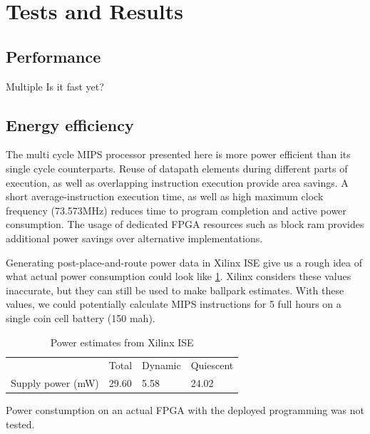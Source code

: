 \section{Tests and Results}


\subsection{Performance}

Multiple 
Is it fast yet?

\subsection{Energy efficiency}

The multi cycle MIPS processor presented here is more power efficient than its single cycle counterparts.
Reuse of datapath elements during different parts of execution, as well as overlapping instruction execution provide area savings.
A short average-instruction execution time, as well as high maximum clock frequency (73.573MHz) reduces time to program completion and active power consumption.
The usage of dedicated FPGA resources such as block ram provides additional power savings over alternative implementations.

Generating post-place-and-route power data in Xilinx ISE give us a rough idea of what actual power consumption could look like \ref{tab:power-estimates}.
Xilinx considers these values inaccurate, but they can still be used to make ballpark estimates.
With these values, we could potentially calculate MIPS instructions for 5 full hours on a single coin cell battery (150 mah).

\begin{table}[h]
  \centering
  \begin{tabular}{llll}
    & Total & Dynamic & Quiescent \\
    Supply power (mW) & 29.60 & 5.58    & 24.02
  \end{tabular}
  \caption{Power estimates from Xilinx ISE}
  \label{tab:power-estimates}
\end{table}

Power constumption on an actual FPGA with the deployed programming was not tested.

